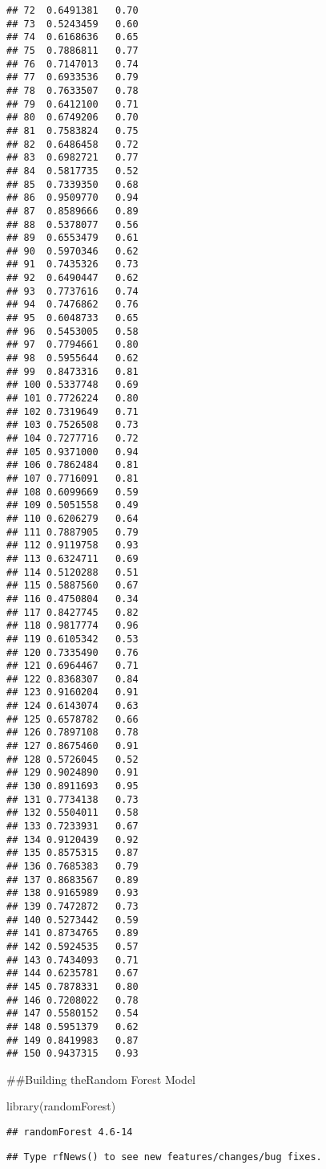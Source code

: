 \documentclass[
]{article}
\newenvironment{Shaded}{\begin{snugshade}}{\end{snugshade}}
\newcommand{\FunctionTok}[1]{\textcolor[rgb]{0.00,0.00,0.00}{#1}}
\newcommand{\NormalTok}[1]{#1}
\begin{document}
\begin{verbatim}
## 72  0.6491381   0.70
## 73  0.5243459   0.60
## 74  0.6168636   0.65
## 75  0.7886811   0.77
## 76  0.7147013   0.74
## 77  0.6933536   0.79
## 78  0.7633507   0.78
## 79  0.6412100   0.71
## 80  0.6749206   0.70
## 81  0.7583824   0.75
## 82  0.6486458   0.72
## 83  0.6982721   0.77
## 84  0.5817735   0.52
## 85  0.7339350   0.68
## 86  0.9509770   0.94
## 87  0.8589666   0.89
## 88  0.5378077   0.56
## 89  0.6553479   0.61
## 90  0.5970346   0.62
## 91  0.7435326   0.73
## 92  0.6490447   0.62
## 93  0.7737616   0.74
## 94  0.7476862   0.76
## 95  0.6048733   0.65
## 96  0.5453005   0.58
## 97  0.7794661   0.80
## 98  0.5955644   0.62
## 99  0.8473316   0.81
## 100 0.5337748   0.69
## 101 0.7726224   0.80
## 102 0.7319649   0.71
## 103 0.7526508   0.73
## 104 0.7277716   0.72
## 105 0.9371000   0.94
## 106 0.7862484   0.81
## 107 0.7716091   0.81
## 108 0.6099669   0.59
## 109 0.5051558   0.49
## 110 0.6206279   0.64
## 111 0.7887905   0.79
## 112 0.9119758   0.93
## 113 0.6324711   0.69
## 114 0.5120288   0.51
## 115 0.5887560   0.67
## 116 0.4750804   0.34
## 117 0.8427745   0.82
## 118 0.9817774   0.96
## 119 0.6105342   0.53
## 120 0.7335490   0.76
## 121 0.6964467   0.71
## 122 0.8368307   0.84
## 123 0.9160204   0.91
## 124 0.6143074   0.63
## 125 0.6578782   0.66
## 126 0.7897108   0.78
## 127 0.8675460   0.91
## 128 0.5726045   0.52
## 129 0.9024890   0.91
## 130 0.8911693   0.95
## 131 0.7734138   0.73
## 132 0.5504011   0.58
## 133 0.7233931   0.67
## 134 0.9120439   0.92
## 135 0.8575315   0.87
## 136 0.7685383   0.79
## 137 0.8683567   0.89
## 138 0.9165989   0.93
## 139 0.7472872   0.73
## 140 0.5273442   0.59
## 141 0.8734765   0.89
## 142 0.5924535   0.57
## 143 0.7434093   0.71
## 144 0.6235781   0.67
## 145 0.7878331   0.80
## 146 0.7208022   0.78
## 147 0.5580152   0.54
## 148 0.5951379   0.62
## 149 0.8419983   0.87
## 150 0.9437315   0.93
\end{verbatim}

\#\#Building theRandom Forest Model

\begin{Shaded}
\begin{Highlighting}[]
\FunctionTok{library}\NormalTok{(randomForest)}
\end{Highlighting}
\end{Shaded}

\begin{verbatim}
## randomForest 4.6-14
\end{verbatim}

\begin{verbatim}
## Type rfNews() to see new features/changes/bug fixes.
\end{verbatim}
\end{document}

